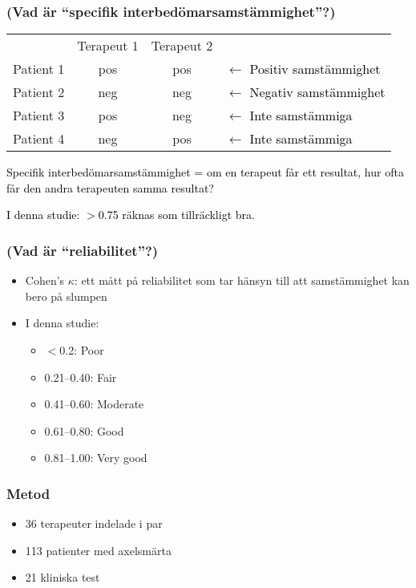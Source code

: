 \documentclass[aspectratio=169,12pt,handout,usenames,dvipsnames]{beamer}
\begin{document}
\begin{frame}
	\frametitle{(Vad är ``specifik interbedömarsamstämmighet''?)}
	{
		\setlength\extrarowheight{2pt}
		\noindent\begin{tabular}{c|ccl}
			& Terapeut 1  & Terapeut 2 & \\
			\cline{1-3}
			Patient 1 & pos & pos & \textcolor{black}{$\leftarrow$ Positiv samstämmighet}\\
			Patient 2 & neg & neg &\textcolor{black}{$\leftarrow$ Negativ samstämmighet}\\
			Patient 3 & pos & neg &\textcolor{black}{$\leftarrow$ Inte samstämmiga}\\
			Patient 4 & neg & pos &\textcolor{black}{$\leftarrow$ Inte samstämmiga}\\
		\end{tabular}
	}\par
	\vspace{2em}
	\par \textcolor{black}{Specifik interbedömarsamstämmighet = om en terapeut får ett resultat, hur ofta får den andra terapeuten samma resultat?}
	\vspace{1em}
	\par \textcolor{black}{I denna studie: $>$0.75 räknas som tillräckligt bra.}
\end{frame}

\begin{frame}
	\frametitle{(Vad är ``reliabilitet''?)}
	\begin{itemize}
		\item Cohen's $\kappa$: ett mått på reliabilitet som tar hänsyn till att samstämmighet kan bero på slumpen
		\item I denna studie:
		\begin{itemize}
			\item $<$0.2: Poor
			\item 0.21--0.40: Fair
			\item 0.41--0.60: Moderate
			\item 0.61--0.80: Good
			\item 0.81--1.00: Very good 	
		\end{itemize}
	\end{itemize}
\end{frame}

\begin{frame}
	\frametitle{Metod}
	\begin{itemize}
		\item 36 terapeuter indelade i par
		\item 113 patienter med axelsmärta
		\item 21 kliniska test
	\end{itemize}
\end{frame}
\end{document}
